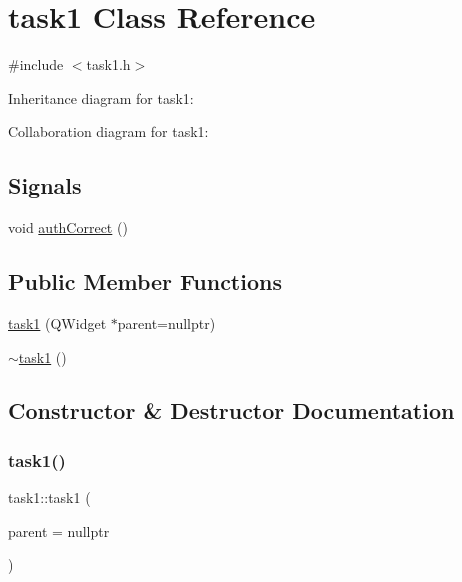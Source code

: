 \hypertarget{classtask1}{}\section{task1 Class Reference}
\label{classtask1}


{\ttfamily \#include $<$task1.\+h$>$}



Inheritance diagram for task1\+:


Collaboration diagram for task1\+:
\subsection*{Signals}
\begin{DoxyCompactItemize}
\item 
void \mbox{\hyperlink{classtask1_ae73fc9c71d989f54e6e80decd4eb5cd1}{auth\+Correct}} ()
\end{DoxyCompactItemize}
\subsection*{Public Member Functions}
\begin{DoxyCompactItemize}
\item 
\mbox{\hyperlink{classtask1_a1a17e74a96e8fe9a544a7430a63215bf}{task1}} (Q\+Widget $\ast$parent=nullptr)
\item 
\mbox{\hyperlink{classtask1_ae84aeb78d8edad28e03561851c464f37}{$\sim$task1}} ()
\end{DoxyCompactItemize}


\subsection{Constructor \& Destructor Documentation}
\mbox{\label{classtask1_a1a17e74a96e8fe9a544a7430a63215bf}} 
\subsubsection{\texorpdfstring{task1()}{task1()}}
{\footnotesize\ttfamily task1\+::task1 (\begin{DoxyParamCaption}\item[{Q\+Widget $\ast$}]{parent = {\ttfamily nullptr} }\end{DoxyParamCaption})\hspace{0.3cm}{\ttfamily [explicit]}}


